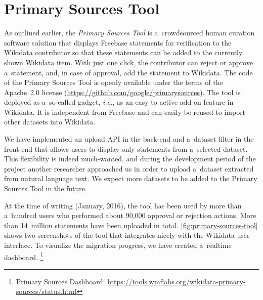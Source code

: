 \documentclass{sig-alternate-2013}
\begin{document}
\section{Primary Sources Tool}\label{sec:primary-sources-tool}

As outlined earlier, the \emph{Primary Sources Tool} is a~crowdsourced human curation
software solution that displays Freebase statements for verification to the Wikidata contributor
so that these statements can be added to the currently shown Wikidata item.
With just one click, the contributor can reject or approve a~statement,
and, in case of approval, add the statement to Wikidata.
The code of the Primary Sources Tool is openly available
under the terms of the Apache~2.0 license (\url{https://github.com/google/primarysources}).
The tool is deployed as a~so-called gadget,
\emph{i.e.}, as an easy to active add-on feature in Wikidata.
It is independent from Freebase and can easily be reused to import other datasets into Wikidata.

We have implemented an upload API in the back-end
and a~dataset filter in the front-end that allows users
to display only statements from a~selected dataset.
This flexibility is indeed much-wanted, and during the development period of the project
another researcher approached us in order to upload
a~dataset extracted from natural language text.
We expect more datasets to be added to the Primary Sources Tool in the future.

At the time of writing (January, 2016), the tool has been used by more than a~hundred users
who performed about 90,000 approval or rejection actions.
More than 14~million statements have been uploaded in total.
\autoref{fig:primary-sources-tool} shows two screenshots
of the tool that integrates nicely with the Wikidata user interface.
To visualize the migration progress, we have created a~realtime dashboard.%
\footnote{Primary Sources Dashboard:
\url{https://tools.wmflabs.org/wikidata-primary-sources/status.html}}
\end{document}
